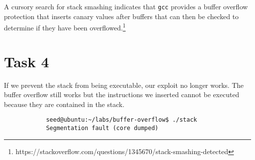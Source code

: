 \documentclass[12pt,letterpaper]{article}
\begin{document}
		A cursory search for stack smashing indicates that \texttt{gcc} provides a buffer overflow protection that inserts canary values after buffers that can then be checked to determine if they have been overflowed.\footnote{https://stackoverflow.com/questions/1345670/stack-smashing-detected}
		
	\section*{Task 4}
		If we prevent the stack from being executable, our exploit no longer works. The buffer overflow still works but the instructions we inserted cannot be executed because they are contained in the stack.
		
		\begin{verbatim}
			seed@ubuntu:~/labs/buffer-overflow$ ./stack 
			Segmentation fault (core dumped)
		\end{verbatim}
\end{document}
